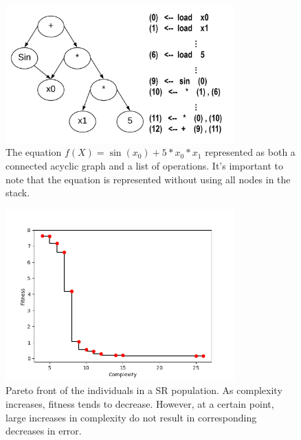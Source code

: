 \begin{figure}[h]
\centering
\includegraphics[width=250pt,height=\textheight,keepaspectratio]{agraph.png}
\caption{The equation $f(X) = \sin(x_{0}) + 5*x_{0}*x_{1}$ represented as both a
connected acyclic graph and a list of operations. It's important to note that
the equation is represented without using all nodes in the stack.}
\label{fig:agraph}
\end{figure}

\begin{figure}[h]
\centering
\includegraphics[width=250pt,height=\textheight,keepaspectratio]{pareto_front.png}
\caption{Pareto front of the individuals in a SR population. As complexity
increases, fitness tends to decrease. However, at a certain point, large
increases in complexity do not result in corresponding decreases in error.}
\label{fig:pareto_front}
\end{figure}